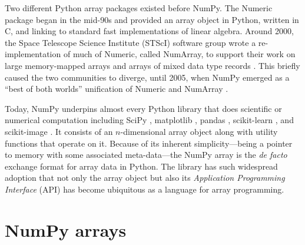 Two different Python array packages existed before NumPy.
The Numeric package began in the mid-90s and provided an array object in
Python, written in C, and linking to standard fast implementations of linear
algebra.
Around 2000, the Space Telescope Science Institute (STScI) software group wrote
a re-implementation of much of Numeric, called NumArray, to support their work
on large memory-mapped arrays and arrays of mixed data type
records \cite{STScI-slither}.
This briefly caused the two communities to diverge, until
2005, when NumPy emerged as a ``best of both worlds'' unification of Numeric
and NumArray \cite{oliphant2006guide}.

Today, NumPy underpins almost every Python library that does scientific or
numerical computation including SciPy \cite{virtanen2019scipy},
matplotlib \cite{hunter2007matplotlib}, pandas \cite{mckinney-proc-scipy-2010},
scikit-learn \cite{pedregosa2011scikit}, and
scikit-image \cite{vanderwalt2014scikit}.
It consists of an $n$-dimensional array object along with utility functions
that operate on it.
Because of its inherent simplicity---being a pointer to memory with some
associated meta-data---the NumPy array is
the {\it de facto} exchange format for array data in Python.
The library has such widespread adoption that not only the array object but also its
{\it Application Programming Interface} (API) has become ubiquitous as
a language for array programming.

\section*{NumPy arrays}

